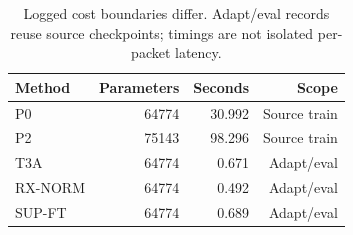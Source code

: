 \begin{table}[t]
\centering
\caption{Logged cost boundaries differ. Adapt/eval records reuse source checkpoints; timings are not isolated per-packet latency.}
\label{tab:compute}
\small
\begin{tabular}{lrrr}
\toprule
Method & Parameters & Seconds & Scope\\
\midrule
P0 & 64774 & 30.992 & Source train\\
P2 & 75143 & 98.296 & Source train\\
T3A & 64774 & 0.671 & Adapt/eval\\
RX-NORM & 64774 & 0.492 & Adapt/eval\\
SUP-FT & 64774 & 0.689 & Adapt/eval\\
\bottomrule
\end{tabular}
\end{table}
